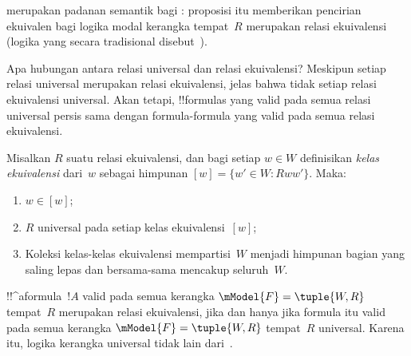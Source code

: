 \documentclass[../../../include/open-logic-section]{subfiles}
\begin{document}
 merupakan padanan semantik bagi
: proposisi itu memberikan pencirian ekuivalen bagi
logika modal kerangka tempat~$R$ merupakan relasi ekuivalensi (logika yang
secara tradisional disebut~).

Apa hubungan antara relasi universal dan relasi ekuivalensi? Meskipun setiap
relasi universal merupakan relasi ekuivalensi, jelas bahwa tidak setiap relasi
ekuivalensi universal. Akan tetapi, !!{formula}s yang valid pada semua relasi
universal persis sama dengan formula-formula yang valid pada semua relasi
ekuivalensi.

\begin{prop}
  Misalkan $R$ suatu relasi ekuivalensi, dan bagi setiap $w\in W$ definisikan
  \emph{kelas ekuivalensi} dari~$w$ sebagai himpunan
  $[w]=\{w'\in W:Rww'\}$. Maka:
  \begin{enumerate}
  \item $w\in[w]$;
  \item $R$ universal pada setiap kelas ekuivalensi~$[w]$;
  \item Koleksi kelas-kelas ekuivalensi mempartisi~$W$ menjadi himpunan bagian
    yang saling lepas dan bersama-sama mencakup seluruh~$W$.
  \end{enumerate}
\end{prop}

\begin{prop}
  !!^a{formula}~$!A$ valid pada semua kerangka
  $\mModel{F}=\tuple{W,R}$ tempat~$R$ merupakan relasi ekuivalensi, jika dan
  hanya jika formula itu valid pada semua kerangka
  $\mModel{F}=\tuple{W,R}$ tempat~$R$ universal. Karena itu, logika kerangka
  universal tidak lain dari~.
\end{prop}
\end{document}
